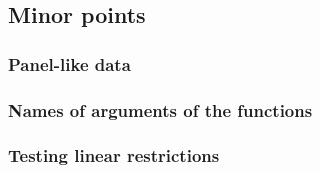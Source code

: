 \documentclass[12pt,english]{scrartcl}
\begin{document}
\subsection{Minor points}

\subsubsection{Panel-like data}

\subsubsection{Names of arguments of the functions}

\subsubsection{Testing linear restrictions}
\end{document}

